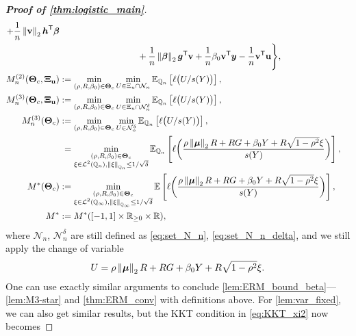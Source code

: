 \begin{proof}[\textbf{Proof of \cref{thm:logistic_main}}]
\begin{align*}
         + \frac1n \norm{\bv}_2 \hh^\top \vbeta 
         \\
        & \phantom{.} \phantom{ 
            : = \smash {\min_{ \substack{ (\bbeta , \beta_0) \in \bTheta_{\vbeta} \\  \bu \in \bXi_{\bu} } } }
        \max_{ \bv \in \R^n }
        \, \Biggl\{
        }
         + \frac1n \norm{\vbeta}_2 \vg^\top \bv 
         + \frac1n \beta_0 \bv^\top \yy - \frac1n \bv^\top \bu
         \Biggr\},
        \\
        M_n^{(2)}(\bTheta_{c}, \bXi_{\bu})
        & := \min_{ (\rho, R, \beta_0) \in \bTheta_{c} }
        \min_{ U \in \Xi_{u}  \cap   \mathcal{N}_n }
        \E_{\Q_n}\left[\ell \bigl( U/s(Y) \bigr)\right],
        \\
        M_n^{(3)}(\bTheta_{c}, \bXi_{\bu}) 
        & :=  
        \min_{ (\rho, R, \beta_0) \in \bTheta_{c} } 
        \min_{ U \in \Xi_{u}  \cap   \mathcal{N}^\delta_n }
        \E_{\Q_n}\left[\ell \bigl( U/s(Y) \bigr)\right],
        \\
        M_n^{(3)}(\bTheta_{c}) 
        & :=  
        \min_{ (\rho, R, \beta_0) \in \bTheta_{c} } 
        \min_{ U \in \mathcal{N}^\delta_n }
        \E_{\Q_n}\left[\ell \bigl( U/s(Y) \bigr)\right],
        \\
        & \phantom{:}= \min_{ \substack{ (\rho, R, \beta_0) \in \bTheta_{c} \\ \xi \in \cL^2(\Q_n), \norm{\xi}_{\Q_n} \le 1/\sqrt{\delta} } } 
    \E_{\Q_n} \left[ \ell \biggl( \frac{ \rho\norm{\vmu}_2 R + RG + \beta_0 Y + R\sqrt{1 - \rho^2} \xi }{s(Y)} \biggr) \right],
        \\
         M^*(\bTheta_{c})
     & := \min_{ \substack{ (\rho, R, \beta_0) \in \bTheta_{c} \\ \xi \in \cL^2(\Q_\infty), \norm{\xi}_{\Q_\infty} \le 1/\sqrt{\delta} } } 
    \E \left[ \ell \biggl( \frac{ \rho\norm{\vmu}_2 R + RG + \beta_0 Y + R\sqrt{1 - \rho^2} \xi }{s(Y)} \biggr) \right],
        \\
        M^* & := M^*([-1, 1] \times \R_{\ge 0} \times \R),
    \end{align*}
    where $\mathcal{N}_n$, $\mathcal{N}^\delta_n$ are still defined as \cref{eq:set_N_n}, \eqref{eq:set_N_n_delta}, and we still apply the change of variable
    \begin{equation*}
    U = \rho\left\|{{\boldsymbol{\mu}}}\right\|_2 R + RG + \beta_0 Y + R\sqrt{1 - \rho^2} \xi.
    \end{equation*}
    One can use exactly similar arguments to conclude \cref{lem:ERM_bound_beta}---\ref{lem:M3-star} and \cref{thm:ERM_conv} with definitions above. For \cref{lem:var_fixed}, we can also get similar results, but the KKT condition in \cref{eq:KKT_xi2} now becomes

\end{proof}
